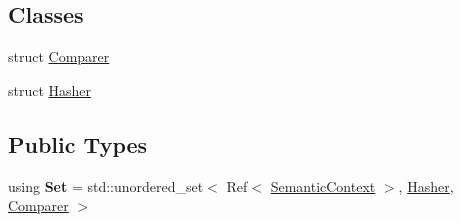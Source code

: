 \subsection*{Classes}
\begin{DoxyCompactItemize}
\item 
struct \hyperlink{structantlr4_1_1atn_1_1SemanticContext_1_1Comparer}{Comparer}
\item 
struct \hyperlink{structantlr4_1_1atn_1_1SemanticContext_1_1Hasher}{Hasher}
\end{DoxyCompactItemize}
\subsection*{Public Types}
\begin{DoxyCompactItemize}
\item 
\mbox{\label{classantlr4_1_1atn_1_1SemanticContext_a7f2ee5eb7e0604f7923fdfafccd64979}} 
using {\bfseries Set} = std\+::unordered\+\_\+set$<$ Ref$<$ \hyperlink{classantlr4_1_1atn_1_1SemanticContext}{Semantic\+Context} $>$, \hyperlink{structantlr4_1_1atn_1_1SemanticContext_1_1Hasher}{Hasher}, \hyperlink{structantlr4_1_1atn_1_1SemanticContext_1_1Comparer}{Comparer} $>$
\end{DoxyCompactItemize}

